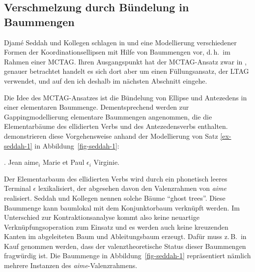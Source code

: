 \subsection{Verschmelzung durch Bündelung in Baummengen}

Djam\'e Seddah und Kollegen schlagen in \cite{Seddah:08} und \cite{Seddah:etal:10} eine Modellierung verschiedener Formen der Koordinationsellipsen mit Hilfe von Baummengen vor, d.\,h.\ im Rahmen einer MCTAG. Ihren Ausgangspunkt hat der MCTAG-Ansatz zwar in \cite{Seddah:Sagot:06}, genauer betrachtet handelt es sich dort aber um einen Füllungsansatz, der LTAG verwendet, und auf den ich deshalb im nächsten Abschnitt eingehe.

Die Idee des MCTAG-Ansatzes ist die Bündelung von Ellipse und Antezedens in einer elementaren Baummenge. Dementsprechend werden zur Gappingmodellierung elementare Baummengen angenommen, die die Elementarbäume des ellidierten Verbs und des Antezedensverbs enthalten. \cite{Seddah:etal:10} demonstrieren diese Vorgehensweise anhand der Modellierung von Satz \ref{ex-seddah-1} in Abbildung~\ref{fig-seddah-1}:

\ex. \label{ex-seddah-1} Jean aime$_i$ Marie et Paul $\epsilon_i$ Virginie. \hfill \citep[(1)]{Seddah:etal:10}

Der Elementarbaum des ellidierten Verbs wird durch ein phonetisch leeres Terminal $\epsilon$ lexikalisiert, der abgesehen davon den Valenzrahmen von {\it aime} realisiert. Seddah und Kollegen nennen solche Bäume "`ghost trees"'. Diese Baummenge kann baumlokal mit dem Konjunktorbaum verknüpft werden. Im Unterschied zur Kontraktionsanalyse kommt also keine neuartige Verknüpfungsoperation zum Einsatz und es werden auch keine kreuzenden Kanten im abgeleiteten Baum und Ableitungsbaum erzeugt. Dafür muss z.\,B.\ in Kauf genommen werden, dass der valenztheoretische Status dieser Baummengen fragwürdig ist. Die Baummenge in Abbildung~\ref{fig-seddah-1} repräsentiert nämlich mehrere Instanzen des {\it aime}-Valenzrahmens. 

